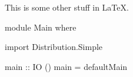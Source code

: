This is some other stuff in \LaTeX.

\begin{code}
module Main where

import Distribution.Simple

main :: IO ()
main = defaultMain
\end{code}
